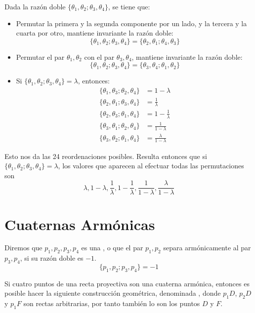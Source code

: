 Dada la razón doble $\{\theta_1,\theta_2;\theta_3,\theta_4\}$, se tiene que:
\begin{itemize}
	\item Permutar la primera y la segunda componente por un lado, y la tercera y la cuarta por otro, mantiene invariante la razón doble: \[\{\theta_1,\theta_2;\theta_3,\theta_4\}=\{\theta_2,\theta_1;\theta_4,\theta_3\}\]
	
	\item Permutar el par $\theta_1,\theta_2$ con el par $\theta_3,\theta_4$, mantiene invariante la razón doble: \[\{\theta_1,\theta_2;\theta_3,\theta_4\}=\{\theta_3,\theta_4;\theta_1,\theta_2\}\]
	
	\item Si $\{\theta_1,\theta_2;\theta_3,\theta_4\}=\lambda$, entonces:
	\begin{equation*}
		\begin{split}
			\{\theta_1,\theta_3;\theta_2,\theta_4\}&=1-\lambda\\
			\{\theta_2,\theta_1;\theta_3,\theta_4\}&=\frac{1}{\lambda}\\
			\{\theta_2,\theta_3;\theta_1,\theta_4\}&=1-\frac{1}{\lambda}\\
			\{\theta_3,\theta_1;\theta_2,\theta_4\}&=\frac{1}{1-\lambda}\\
			\{\theta_3,\theta_2;\theta_1,\theta_4\}&=\frac{\lambda}{1-\lambda}
		\end{split}
	\end{equation*}
\end{itemize}
Esto nos da las 24 reordenaciones posibles. Resulta entonces que si $\{\theta_1,\theta_2;\theta_3,\theta_4\}=\lambda$, los valores que aparecen al efectuar todas las permutaciones son 
\[\lambda,1-\lambda,\frac{1}{\lambda},1-\frac{1}{\lambda},\frac{1}{1-\lambda},\frac{\lambda}{1-\lambda}\]
\section{Cuaternas Armónicas}
\begin{defi}
	Diremos que $p_1,p_2,p_3,p_4$ es una , o que el par $p_1,p_2$ separa armónicamente al par $p_3,p_4$, si su razón doble es $-1$.
	\begin{equation}
		\{p_1,p_2;p_3,p_4\}=-1
	\end{equation}
\end{defi}
Si cuatro puntos de una recta proyectiva son una cuaterna armónica, entonces es posible hacer la siguiente construcción geométrica, denominada , donde $p_1D$, $p_2D$ y $p_1F$ son rectas arbitrarias, por tanto también lo son los puntos $D$ y $F$.

